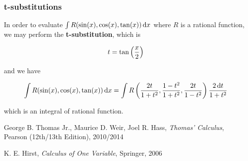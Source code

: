 \documentclass[a4paper,12pt]{article}
\begin{document}
\subsubsection{t-substitutions}
In order to evaluate $\int R(\sin(x),\cos(x),\tan(x))\,\mathrm{d} x$ where $R$ is a rational function, we may perform the \textbf{t-substitution}, which is

$$t=\tan\left( \frac{x}{2}\right)$$\s

and we have

$$\int R(\sin(x),\cos(x),\tan(x))\,\mathrm{d} x=\int R\left( \frac{2t}{1+t^{2}},\frac{1-t^{2}}{1+t^{2}},\frac{2t}{1-t^{2}}\right)\frac{2\,\mathrm{d} t}{1+t^{2}}$$\s

which is an integral of rational function.



\begin{reflist}
  \item George B. Thomas Jr., Maurice D. Weir, Joel R. Hass, \textit{Thomas' Calculus}, Pearson (12th/13th Edition), 2010/2014
  \item K. E. Hirst, \textit{Calculus of One Variable}, Springer, 2006
\end{reflist}
\end{document}
